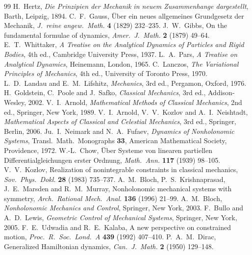 \documentclass[11pt,a4paper]{article}
\theoremstyle{definition}
\theoremstyle{plain}
\theoremstyle{remark}
\begin{document}
\begin{thebibliography}{99}
 H.~Hertz, \emph{Die Prinzipien der Mechanik in neuem Zusammenhange dargestellt}, Barth, Leipzig, 1894.
 C.~F.~Gauss, \"Uber ein neues allgemeines Grundgesetz der Mechanik, \emph{J.\ reine angew.\ Math.} \textbf{4} (1829) 232--235.
 J.~W.~Gibbs, On the fundamental formulae of dynamics, \emph{Amer.\ J.\ Math.} \textbf{2} (1879) 49--64.
 E.~T.~Whittaker, \emph{A Treatise on the Analytical Dynamics of Particles and Rigid Bodies}, 4th ed., Cambridge University Press, 1937.
 L.~A.~Pars, \emph{A Treatise on Analytical Dynamics}, Heinemann, London, 1965.
 C.~Lanczos, \emph{The Variational Principles of Mechanics}, 4th ed., University of Toronto Press, 1970.
 L.~D.~Landau and E.~M.~Lifshitz, \emph{Mechanics}, 3rd ed., Pergamon, Oxford, 1976.
 H.~Goldstein, C.~Poole and J.~Safko, \emph{Classical Mechanics}, 3rd ed., Addison-Wesley, 2002.
 V.~I.~Arnold, \emph{Mathematical Methods of Classical Mechanics}, 2nd ed., Springer, New York, 1989.
 V.~I.~Arnold, V.~V.~Kozlov and A.~I.~Neishtadt, \emph{Mathematical Aspects of Classical and Celestial Mechanics}, 3rd ed., Springer, Berlin, 2006.
 Ju.~I.~Neimark and N.~A.~Fufaev, \emph{Dynamics of Nonholonomic Systems}, Transl.\ Math.\ Monographs \textbf{33}, American Mathematical Society, Providence, 1972.
 W.-L.~Chow, \"Uber Systeme von linearen partiellen Differentialgleichungen erster Ordnung, \emph{Math.\ Ann.} \textbf{117} (1939) 98--105.
 V.~V.~Kozlov, Realization of nonintegrable constraints in classical mechanics, \emph{Sov.\ Phys.\ Dokl.} \textbf{28} (1983) 735--737.
 A.~M.~Bloch, P.~S.~Krishnaprasad, J.~E.~Marsden and R.~M.~Murray, Nonholonomic mechanical systems with symmetry, \emph{Arch.\ Rational Mech.\ Anal.} \textbf{136} (1996) 21--99.
 A.~M.~Bloch, \emph{Nonholonomic Mechanics and Control}, Springer, New York, 2003.
 F.~Bullo and A.~D.~Lewis, \emph{Geometric Control of Mechanical Systems}, Springer, New York, 2005.
 F.~E.~Udwadia and R.~E.~Kalaba, A new perspective on constrained motion, \emph{Proc.\ R.\ Soc.\ Lond.\ A} \textbf{439} (1992) 407--410.
 P.~A.~M.~Dirac, Generalized Hamiltonian dynamics, \emph{Can.\ J.\ Math.} \textbf{2} (1950) 129--148.

\end{thebibliography}
\end{document}
